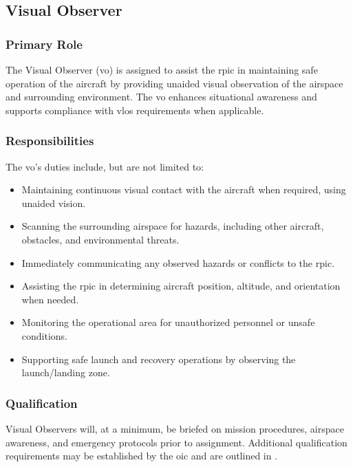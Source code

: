         \subsection{Visual Observer}\label{role:visualobserver}

            \subsubsection{Primary Role} The Visual Observer (\ac{vo}) is assigned to assist the \ac{rpic} in maintaining safe operation of the aircraft by providing unaided visual observation of the airspace and surrounding environment. The \ac{vo} enhances situational awareness and supports compliance with \ac{vlos} requirements when applicable.

            \subsubsection{Responsibilities} The \ac{vo}'s duties include, but are not limited to:
            \begin{itemize}
                \item Maintaining continuous visual contact with the aircraft when required, using unaided vision.
                \item Scanning the surrounding airspace for hazards, including other aircraft, obstacles, and environmental threats.
                \item Immediately communicating any observed hazards or conflicts to the \ac{rpic}.
                \item Assisting the \ac{rpic} in determining aircraft position, altitude, and orientation when needed.
                \item Monitoring the operational area for unauthorized personnel or unsafe conditions.
                \item Supporting safe launch and recovery operations by observing the launch/landing zone.
            \end{itemize}
            
            \subsubsection{Qualification} Visual Observers will, at a minimum, be briefed on mission procedures, airspace awareness, and emergency protocols prior to assignment. Additional qualification requirements may be established by the \projectmars{} \ac{oic} and are outlined in .

    
    
